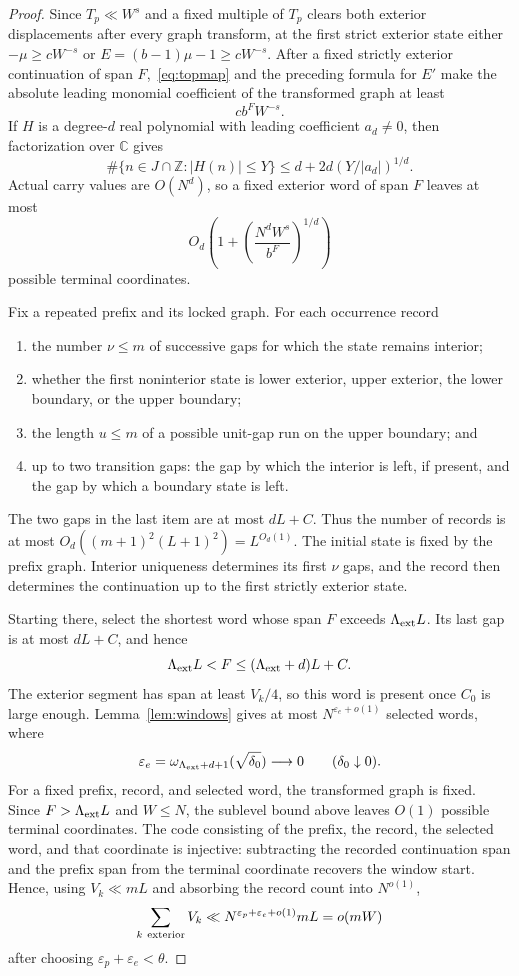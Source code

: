 \documentclass[a4paper,10pt]{amsart}
\theoremstyle{remark}
\newcommand{\Z}{\mathbb Z}
\begin{document}
\begin{proof}
Since $T_p\ll W^s$ and a fixed multiple of $T_p$ clears both exterior
displacements after every graph transform, at the first strict exterior state
either
$-\mu\ge cW^{-s}$ or $E=(b-1)\mu-1\ge cW^{-s}$. After a fixed
strictly exterior continuation of span $F$,~\eqref{eq:topmap} and the
preceding formula for $E'$ make the absolute leading monomial coefficient of
the transformed graph at least
\[
 cb^FW^{-s}.
\]
If $H$ is a degree-$d$ real polynomial with leading coefficient $a_d\ne0$,
then factorization over $\mathbb C$ gives
\begin{equation}\label{eq:sublevel}
 \#\{n\in J\cap\Z:|H(n)|\le Y\}
 \le d+2d(Y/|a_d|)^{1/d}.
\end{equation}
Actual carry values are $O(N^d)$, so a fixed exterior word of span $F$
leaves at most
\[
 O_d\left(1+\left(\frac{N^dW^s}{b^F}\right)^{1/d}\right)
\]
possible terminal coordinates.

Fix a repeated prefix and its locked graph. For each occurrence record
\begin{enumerate}
\item the number $\nu\le m$ of successive gaps for which the state remains
interior;
\item whether the first noninterior state is lower exterior, upper exterior,
the lower boundary, or the upper boundary;
\item the length $u\le m$ of a possible unit-gap run on the upper boundary;
and
\item up to two transition gaps: the gap by which the interior is left, if
present, and the gap by which a boundary state is left.
\end{enumerate}
The two gaps in the last item are at most $dL+C$. Thus the number of records is
at most $O_d((m+1)^2(L+1)^2)=L^{O_d(1)}$. The initial state is fixed by the
prefix graph. Interior uniqueness determines its first $\nu$ gaps, and the
record then determines the continuation up to the first strictly exterior
state.

Starting there, select the shortest word whose span $F$ exceeds
$\Lambda_{\rm ext}L$. Its last gap is at most $dL+C$, and hence
\[
 \Lambda_{\rm ext}L<F\le(\Lambda_{\rm ext}+d)L+C.
\]
The exterior segment has span at least $V_k/4$, so this word is present once
$C_0$ is large enough. Lemma~\ref{lem:windows} gives at
most $N^{\varepsilon_e+o(1)}$ selected words, where
\[
 \varepsilon_e=
 \omega_{\Lambda_{\rm ext}+d+1}(\sqrt{\delta_0})
 \longrightarrow0\qquad(\delta_0\downarrow0).
\]
For a fixed prefix, record, and selected word, the transformed graph is fixed.
Since $F>\Lambda_{\rm ext}L$ and $W\le N$, the sublevel bound above leaves
$O(1)$ possible terminal coordinates. The code consisting of the prefix, the
record, the selected word, and that coordinate is injective: subtracting the
recorded continuation span and the prefix span from the terminal coordinate
recovers the window start. Hence, using $V_k\ll mL$ and absorbing the record
count into $N^{o(1)}$,
\[
 \sum_{k\ {\rm exterior}}V_k
 \ll N^{\varepsilon_p+\varepsilon_e+o(1)}mL=o(mW)
\]
after choosing $\varepsilon_p+\varepsilon_e<\theta$.
\end{proof}
\end{document}
